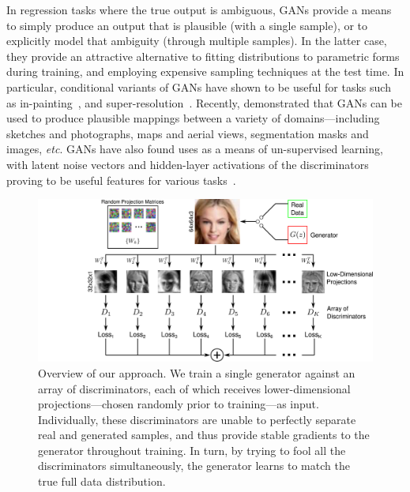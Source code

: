 \documentclass{article}
\begin{document}
In regression tasks where the true output is ambiguous, GANs provide a means to simply produce an output that is plausible (with a single sample), or to explicitly model that ambiguity (through multiple samples). In the latter case, they provide an attractive alternative to fitting distributions to parametric forms during training, and employing expensive sampling techniques at the test time. In particular, conditional variants of GANs have shown to be useful for tasks such as in-painting~\citep{inpgan}, and super-resolution~\citep{srgan}. Recently, \citet{pix2pix} demonstrated that GANs can be used to produce plausible mappings between a variety of domains---including sketches and photographs, maps and aerial views, segmentation masks and images, \emph{etc}. GANs have also found uses as a means of un-supervised learning, with latent noise vectors and hidden-layer activations of the discriminators proving to be useful features for various tasks~\citep{inpgan,chen2016infogan,radford2015unsupervised}.

\begin{figure}[!t]
  \centering
  \includegraphics[width=0.9\columnwidth]{Figs/Fig1.pdf}%
\caption{Overview of our approach. We train a single generator against an array of discriminators, each of which receives lower-dimensional projections---chosen randomly prior to training---as input. Individually, these discriminators are unable to perfectly separate real and generated samples, and thus provide stable gradients to the generator throughout training. In turn, by trying to fool all the discriminators simultaneously, the generator learns to match the true full data distribution.}
  \label{fig:teaser}
\end{figure}
\end{document}

